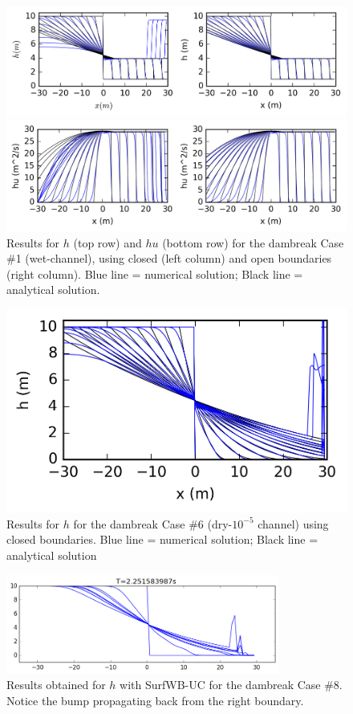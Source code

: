 	\begin{figure}
		\centering
		\includegraphics[width=\textwidth]{figures/db_hwet.png}


		\includegraphics[width=\textwidth]{figures/db_huwet.png}
		\caption{Results for $h$ (top row) and $hu$ (bottom row) for the dambreak Case \#1 (wet-channel), using closed (left column) and open boundaries (right column). Blue line = numerical solution; Black line = analytical solution.}
		\label{nswe:wetchannel}
	\end{figure}
	\begin{figure}
		\centering
		\includegraphics{figures/db_hdry.png}
		\caption{Results for $h$ for the dambreak Case \#6 (dry-$10^{-5}$ channel) using closed boundaries. Blue line = numerical solution; Black line = analytical solution}
		\label{nswe:drychannel}
	\end{figure}

	\begin{figure}
		\centering
		\includegraphics[width=0.8\textwidth]{figures/surfwb_1dfig000320.png}
		\caption{Results obtained for $h$ with SurfWB-UC for the dambreak Case \#8. Notice the bump propagating back from the right boundary. }
		\label{nswe:surfwb}
	\end{figure}

